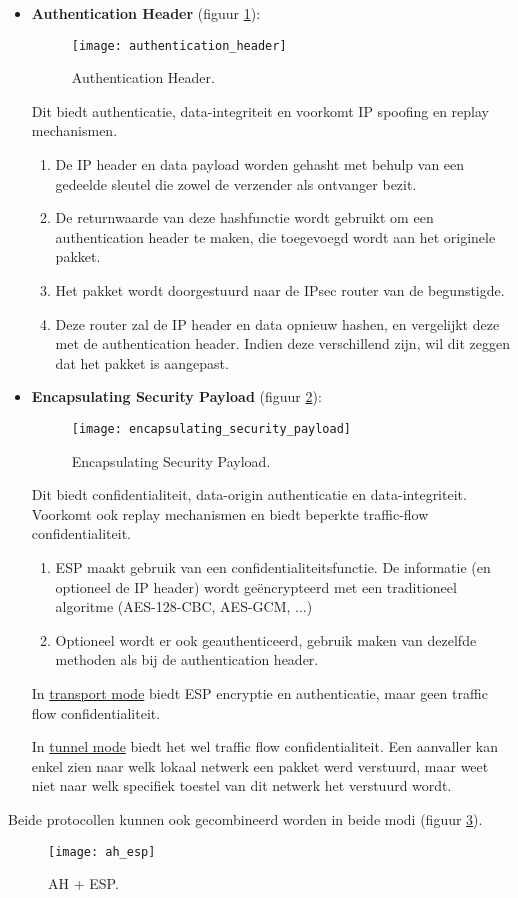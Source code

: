 \documentclass{report}
\begin{document}
	\begin{itemize}
		\item \textbf{Authentication Header} (figuur \ref{fig:authentication_header}): 
		\begin{figure}[ht]
			\texttt{[image: authentication\_header]}
			\caption{Authentication Header.}
			\label{fig:authentication_header}
		\end{figure}
		Dit biedt authenticatie, data-integriteit en voorkomt IP spoofing en replay mechanismen.
		\begin{enumerate}
			\item De IP header en data payload worden gehasht met behulp van een gedeelde sleutel die zowel de verzender als ontvanger bezit.
			\item De returnwaarde van deze hashfunctie wordt gebruikt om een authentication header te maken, die toegevoegd wordt aan het originele pakket.
			\item Het pakket wordt doorgestuurd naar de IPsec router van de begunstigde.
			\item Deze router zal de IP header en data opnieuw hashen, en vergelijkt deze met de authentication header. Indien deze verschillend zijn, wil dit zeggen dat het pakket is aangepast.
		\end{enumerate}
		\item \textbf{Encapsulating Security Payload} (figuur \ref{fig:encapsulating_security_payload}): 
		\begin{figure}[ht]
			\texttt{[image: encapsulating\_security\_payload]}
			\caption{Encapsulating Security Payload.}
			\label{fig:encapsulating_security_payload}
		\end{figure}
		Dit biedt confidentialiteit, data-origin authenticatie en data-integriteit. Voorkomt ook replay mechanismen en biedt beperkte traffic-flow confidentialiteit.
		\begin{enumerate}
			\item ESP maakt gebruik van een confidentialiteitsfunctie. De informatie (en optioneel de IP header) wordt geëncrypteerd met een traditioneel algoritme (AES-128-CBC, AES-GCM, ...)
			\item Optioneel wordt er ook geauthenticeerd, gebruik maken van dezelfde methoden als bij de authentication header.
		\end{enumerate}

		In \underline{transport mode} biedt ESP encryptie en authenticatie, maar geen traffic flow confidentialiteit.

		In \underline{tunnel mode} biedt het wel traffic flow confidentialiteit. Een aanvaller kan enkel zien naar welk lokaal netwerk een pakket werd verstuurd, maar weet niet naar welk specifiek toestel van dit netwerk het verstuurd wordt.
		
	\end{itemize}
	Beide protocollen kunnen ook gecombineerd worden in beide modi (figuur \ref{fig:ah_esp}).
	\begin{figure}[ht]
		\texttt{[image: ah\_esp]}
		\caption{AH + ESP.}
		\label{fig:ah_esp}
	\end{figure}
\end{document}
